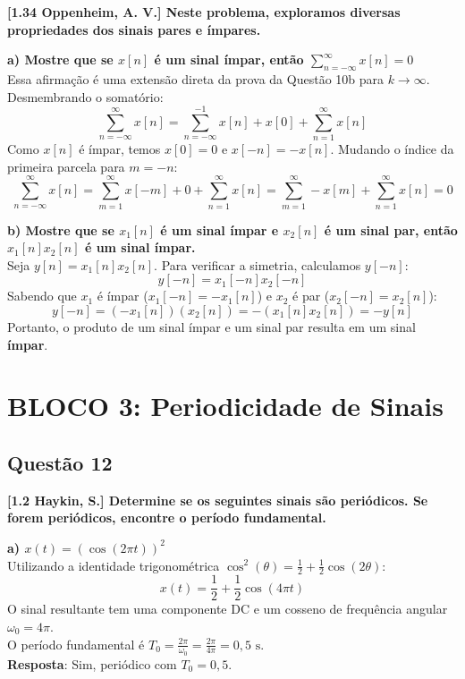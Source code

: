 \textbf{{[}1.34 Oppenheim, A. V.{]} Neste problema, exploramos diversas propriedades dos sinais pares e ímpares.}

\textbf{a) Mostre que se \(x[n]\) é um sinal ímpar, então \(\sum_{n=-\infty}^{\infty} x[n] = 0\)}\\
Essa afirmação é uma extensão direta da prova da Questão 10b para \(k \to \infty\). Desmembrando o somatório:
\[\sum_{n=-\infty}^{\infty} x[n] = \sum_{n=-\infty}^{-1} x[n] + x[0] + \sum_{n=1}^{\infty} x[n]\]
Como \(x[n]\) é ímpar, temos \(x[0] = 0\) e \(x[-n] = -x[n]\). Mudando o índice da primeira parcela para \(m = -n\):
\[\sum_{n=-\infty}^{\infty} x[n] = \sum_{m=1}^{\infty} x[-m] + 0 + \sum_{n=1}^{\infty} x[n] = \sum_{m=1}^{\infty} -x[m] + \sum_{n=1}^{\infty} x[n] = 0\]

\textbf{b) Mostre que se \(x_1[n]\) é um sinal ímpar e \(x_2[n]\) é um sinal par, então \(x_1[n]x_2[n]\) é um sinal ímpar.}\\
Seja \(y[n] = x_1[n]x_2[n]\). Para verificar a simetria, calculamos \(y[-n]\):
\[y[-n] = x_1[-n]x_2[-n]\]
Sabendo que \(x_1\) é ímpar (\(x_1[-n] = -x_1[n]\)) e \(x_2\) é par (\(x_2[-n] = x_2[n]\)):
\[y[-n] = (-x_1[n])(x_2[n]) = - (x_1[n]x_2[n]) = -y[n]\]
Portanto, o produto de um sinal ímpar e um sinal par resulta em um sinal \textbf{ímpar}.

\section{BLOCO 3: Periodicidade de Sinais}\label{bloco-3-periodicidade-de-sinais}

\subsection{Questão 12}\label{questuxe3o-12}

\textbf{{[}1.2 Haykin, S.{]} Determine se os seguintes sinais são periódicos. Se forem periódicos, encontre o período fundamental.}

\textbf{a) \(x(t) = (\cos(2\pi t))^2\)}\\
Utilizando a identidade trigonométrica \(\cos^2(\theta) = \frac{1}{2} + \frac{1}{2}\cos(2\theta)\):
\[x(t) = \frac{1}{2} + \frac{1}{2}\cos(4\pi t)\]
O sinal resultante tem uma componente DC e um cosseno de frequência angular \(\omega_0 = 4\pi\).\\
O período fundamental é \(T_0 = \frac{2\pi}{\omega_0} = \frac{2\pi}{4\pi} = 0,5 \text{ s}\).\\
\textbf{Resposta}: Sim, periódico com \(T_0 = 0,5\).

